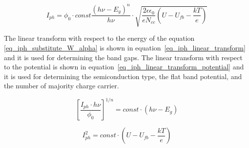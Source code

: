     \begin{equation}
        I_{ph} = \phi _0 \cdot const \frac{(h\nu - E_g)^n}{h\nu}
            \cdot \sqrt{ \frac{2\epsilon \epsilon _0}{e N_{cc}} (U-U_{fb}-\frac{kT}{e}) }
        \label{eq_iph_substitute_W_alpha}
    \end{equation}
    
    The linear transform with respect to the energy of the 
    equation \ref{eq_iph_substitute_W_alpha} is shown in 
    equation~\ref{eq_iph_linear_transform} and it is used for determining 
    the band gaps. 
    The linear transform with respect to the potential is shown in 
    equation~\ref{eq_iph_linear_transform_potential} and it is used for determining 
    the semiconduction type, the flat band potential, 
    and the number of majority charge carrier.


    \begin{equation}
        \left[ \frac{I_{ph} \cdot h\nu}{\phi _0} \right] ^{1/n} = const \cdot (h\nu - E_g)
        \label{eq_iph_linear_transform}
    \end{equation}

        \begin{equation}
        I_{ph}^2 = const \cdot (U-U_{fb}-\frac{kT}{e})
        \label{eq_iph_linear_transform_potential}
    \end{equation}

